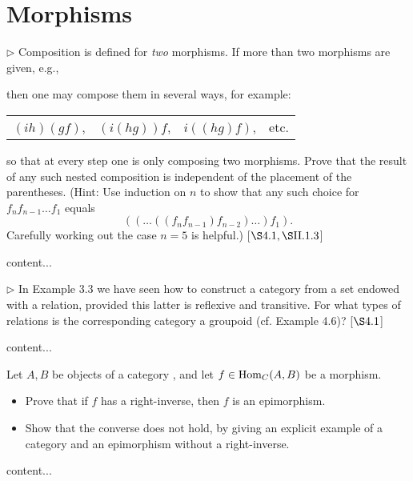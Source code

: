 \section{Morphisms}
\extitle

\begin{exercise}
	\(\triangleright\) Composition is defined for \textit{two} morphisms. If more than two morphisms are given, e.g., \vspace*{-0.4em}
	\begin{center}
	\end{center}
	then one may compose them in several ways, for example:
	\begin{center}
		\begin{tabular}{c c c c}
			\((ih)(gf)\), & \((i(hg))f\), & \(i((hg)f)\), & etc.
		\end{tabular}
	\end{center}
	so that at every step one is only composing two morphisms. Prove that the result of any such nested composition is independent of the placement of the parentheses. (Hint: Use induction on \(n\) to show that any such choice for \(f_n f_{n-1} \dots f_1\) equals
	\begin{equation*}
		((\dots ((f_n f_{n-1}) f_{n-2}) \dots )f_1).
	\end{equation*}
	Carefully working out the case \(n = 5\) is helpful.) [\(\S 4.1, \S \RN{2}.1.3\)]
\end{exercise}
\begin{solution}
	content...
\end{solution}

\begin{exercise}
	\(\triangleright\) In Example 3.3 we have seen how to construct a category from a set endowed with a relation, provided this latter is reflexive and transitive. For what types of relations is the corresponding category a groupoid (cf. Example 4.6)? [\(\S 4.1\)]
\end{exercise}
\begin{solution}
	content...
\end{solution}

\begin{exercise}
	Let \(A, B\) be objects of a category , and let \(f \in \operatorname{Hom}_C(A,B)\) be a morphism.
	\begin{itemize}
		\item Prove that if \(f\) has a right-inverse, then \(f\) is an epimorphism.
		\item Show that the converse does not hold, by giving an explicit example of a category and an epimorphism without a right-inverse.
	\end{itemize}
\end{exercise}
\begin{solution}
	content...
\end{solution}


